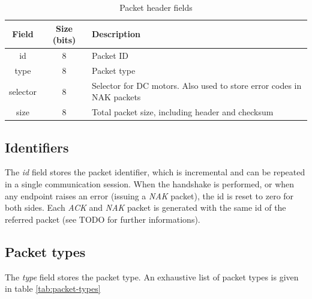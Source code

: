 \documentclass[binding=0.6cm,Lau]{sapthesis}
\begin{document}
\begin{table}[bh]
  \begin{tabularx}{\textwidth}{c c X}
    \toprule
    Field & Size (bits) & Description \\
    \midrule
    id       & 8 & Packet ID \\
    type     & 8 & Packet type \\
    selector & 8 & Selector for DC motors. Also used to store error codes in NAK packets \\
    size     & 8 & Total packet size, including header and checksum \\
    \bottomrule
  \end{tabularx}
  \caption{Packet header fields}
  \label{tab:packet-header}
\end{table}

\subsection{Identifiers}
The \emph{id} field stores the packet identifier, which is incremental and can
be repeated in a single communication session. When the handshake is performed,
or when any endpoint raises an error (issuing a \emph{NAK} packet), the id is
reset to zero for both sides. Each \emph{ACK} and \emph{NAK} packet is
generated with the same id of the referred packet (see TODO for further
informations).

\subsection{Packet types}
The \emph{type} field stores the packet type. An exhaustive list of packet types
is given in table \ref{tab:packet-types}
\end{document}
